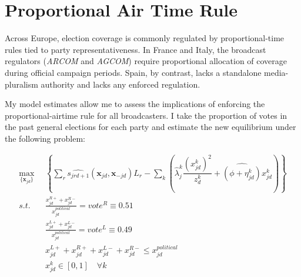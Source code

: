 \documentclass[12pt]{article}
\begin{document}




\FloatBarrier










\section{Proportional Air Time Rule}

\label{sec:counter}


Across Europe, election coverage is commonly regulated by proportional-time rules tied to party representativeness. In France and Italy, the broadcast regulators (\textit{ARCOM} and \textit{AGCOM}) require proportional allocation of coverage during official campaign periods. Spain, by contrast,  lacks a standalone media-pluralism authority and lacks any enforced regulation. 






My model estimates allow me to assess the  implications of enforcing the proportional-airtime rule for all broadcasters.  I take the proportion of votes in the past general elections for each party and estimate the new equilibrium under the following problem: 




\begin{equation}\label{eq:payoffs2}
	\begin{aligned}
		\max_{\{\bm{x}_{jd}\}}   & \left\{   \sum_{r}\widehat{s_{jrd+1}}(\bm{x}_{jd}, \bm{x}_{-jd})L_r - \sum_k \left({\hat{\lambda}_j^k}  \dfrac{(x_{jd}^k)^2}{z_{d}^k} + \widehat{\left(\phi+{\eta}_{jd}^k\right)} x_{jd}^k \right)  \right\}\\
		s.t.   \quad &   \frac{x_{jd}^{R+} + x_{jd}^{R-} }{x_{jd}^{political}}=vote^R\equiv0.51\\
		&  \frac{x_{jd}^{L+} + x_{jd}^{L-} }{x_{jd}^{political}}= vote^L\equiv0.49\\
       &  x_{jd}^{L+} +x_{jd}^{R+} + x_{jd}^{L-} + x_{jd}^{R-} \leq  x_{jd}^{political}\\
		& x_{jd}^k \in [0,1] \quad \forall k
	\end{aligned}
\end{equation} 
\end{document}
